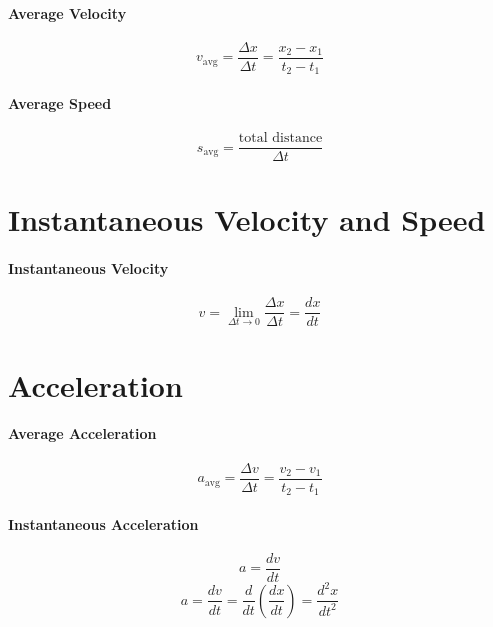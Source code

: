 \documentclass{article}
\begin{document}
        \paragraph{Average Velocity}
        \begin{equation}
            v_{\text{avg}} = \frac{\Delta x}{\Delta t} = \frac{x_2 - x_1}{t_2 - t_1}
        \end{equation}

        \paragraph{Average Speed}
        \begin{equation}
            s_{\text{avg}} = \frac{\text{total distance}}{\Delta t}
        \end{equation}

    \section{Instantaneous Velocity and Speed}

        \paragraph{Instantaneous Velocity}
        \begin{equation}
            v = \lim_{\Delta t \to 0} \frac{\Delta x}{\Delta t} = \frac{dx}{dt}
        \end{equation}

    \section{Acceleration}

        \paragraph{Average Acceleration}
        \begin{equation}
            a_{\text{avg}} = \frac{\Delta v}{\Delta t} = \frac{v_2 - v_1}{t_2 - t_1}
        \end{equation}

        \paragraph{Instantaneous Acceleration}
        \begin{equation}
            a = \frac{dv}{dt}
        \end{equation}
        \begin{equation}
            a = \frac{dv}{dt} = \frac{d}{dt} \left( \frac{dx}{dt} \right) = \frac{d^2x}{dt^2}
        \end{equation}
    
\end{document}
